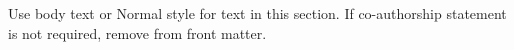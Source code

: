 
Use body text or Normal style for text in this section.
If co-authorship statement is not required, remove from front matter.